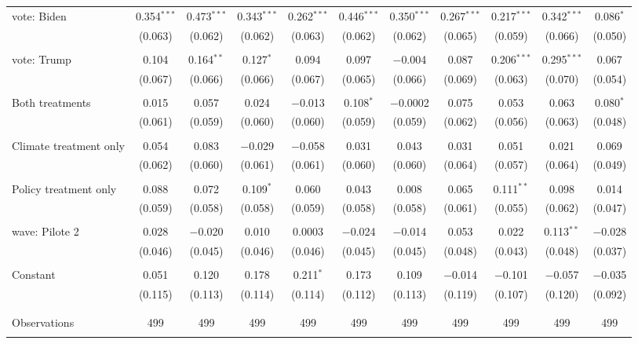 \begin{tabular}{@{\extracolsep{5pt}}lcccccccccc}
 vote: Biden & 0.354$^{***}$ & 0.473$^{***}$ & 0.343$^{***}$ & 0.262$^{***}$ & 0.446$^{***}$ & 0.350$^{***}$ & 0.267$^{***}$ & 0.217$^{***}$ & 0.342$^{***}$ & 0.086$^{*}$ \\ 
  & (0.063) & (0.062) & (0.062) & (0.063) & (0.062) & (0.062) & (0.065) & (0.059) & (0.066) & (0.050) \\ 
  & & & & & & & & & & \\ 
 vote: Trump & 0.104 & 0.164$^{**}$ & 0.127$^{*}$ & 0.094 & 0.097 & $-$0.004 & 0.087 & 0.206$^{***}$ & 0.295$^{***}$ & 0.067 \\ 
  & (0.067) & (0.066) & (0.066) & (0.067) & (0.065) & (0.066) & (0.069) & (0.063) & (0.070) & (0.054) \\ 
  & & & & & & & & & & \\ 
 Both treatments & 0.015 & 0.057 & 0.024 & $-$0.013 & 0.108$^{*}$ & $-$0.0002 & 0.075 & 0.053 & 0.063 & 0.080$^{*}$ \\ 
  & (0.061) & (0.059) & (0.060) & (0.060) & (0.059) & (0.059) & (0.062) & (0.056) & (0.063) & (0.048) \\ 
  & & & & & & & & & & \\ 
 Climate treatment only & 0.054 & 0.083 & $-$0.029 & $-$0.058 & 0.031 & 0.043 & 0.031 & 0.051 & 0.021 & 0.069 \\ 
  & (0.062) & (0.060) & (0.061) & (0.061) & (0.060) & (0.060) & (0.064) & (0.057) & (0.064) & (0.049) \\ 
  & & & & & & & & & & \\ 
 Policy treatment only & 0.088 & 0.072 & 0.109$^{*}$ & 0.060 & 0.043 & 0.008 & 0.065 & 0.111$^{**}$ & 0.098 & 0.014 \\ 
  & (0.059) & (0.058) & (0.058) & (0.059) & (0.058) & (0.058) & (0.061) & (0.055) & (0.062) & (0.047) \\ 
  & & & & & & & & & & \\ 
 wave: Pilote 2 & 0.028 & $-$0.020 & 0.010 & 0.0003 & $-$0.024 & $-$0.014 & 0.053 & 0.022 & 0.113$^{**}$ & $-$0.028 \\ 
  & (0.046) & (0.045) & (0.046) & (0.046) & (0.045) & (0.045) & (0.048) & (0.043) & (0.048) & (0.037) \\ 
  & & & & & & & & & & \\ 
 Constant & 0.051 & 0.120 & 0.178 & 0.211$^{*}$ & 0.173 & 0.109 & $-$0.014 & $-$0.101 & $-$0.057 & $-$0.035 \\ 
  & (0.115) & (0.113) & (0.114) & (0.114) & (0.112) & (0.113) & (0.119) & (0.107) & (0.120) & (0.092) \\ 
  & & & & & & & & & & \\ 
\hline \\[-1.8ex] 

Observations & 499 & 499 & 499 & 499 & 499 & 499 & 499 & 499 & 499 & 499 \\ 
\hline 
\hline \\[-1.8ex] 
\end{tabular} 